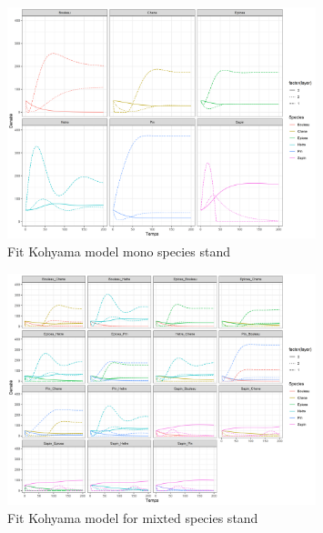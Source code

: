 \documentclass{article}
\begin{document}
\begin{figure}[H]
    \centering
    \includegraphics[width=0.8\textwidth]{Figure/Model_simple.png}
    \caption{Fit Kohyama model mono species stand}
    \label{fig:my_label}
\end{figure}

\begin{figure}[H]
    \centering
    \includegraphics[width=0.8\textwidth]{Figure/Model_mixte.png}
    \caption{Fit Kohyama model for mixted species stand}
    \label{fig:my_label}
\end{figure}
\end{document}
